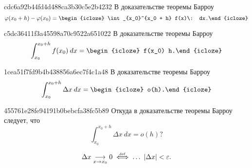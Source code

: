 \begin{note}{cdc6a92b44fd4d488ca3b30c5e2b4232}
    В доказательстве теоремы Барроу
    \[
        \varphi(x_0 + h) - \varphi(x_0) = \begin{icloze}{1}\int_{x_0}^{x_0 + h} f(x)\: dx.\end{icloze}
    \]
\end{note}

\begin{note}{c5dc36411f3a45598a70c9522a651022}
    В доказательстве теоремы Барроу
    \[
        \int_{x_0}^{x_0 + h} f(x_0)\: dx = \begin{icloze}{1}f(x_0) h.\end{icloze}
    \]
\end{note}

\begin{note}{1cea51f7fd9b4b438856a6ec7f4c1a48}
    В доказательстве  теоремы  Барроу
    \[
        \int_{x_0}^{x_0 + h} \Delta x\: dx = \begin{icloze}{1}o(h).\end{icloze}
    \]
\end{note}

\begin{note}{455761e28fe94191b0bebcfa38fc5b89}
    Откуда в доказательстве теоремы Барроу следует, что
    \[
        \int_{x_0}^{x_0 + h} \Delta x\: dx = o(h)?
    \]

    \begin{cloze}{1}
        \[
            \Delta x \underset{x \to x_0}\longrightarrow 0 \overset{\hspace{-1pt}\text{\tiny def}}\iff \dots \ \left\lvert \Delta x \right\rvert <  \varepsilon.
        \]
    \end{cloze}
\end{note}


